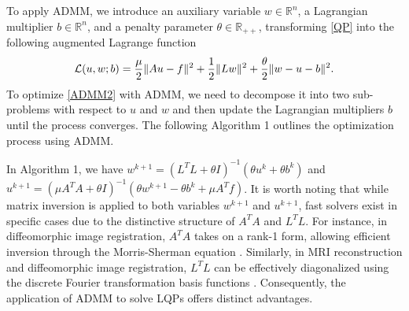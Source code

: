 \documentclass[letterpaper]{article} %
\begin{document}
To apply ADMM, we introduce an auxiliary variable $w \in \mathbb{R}^{n}$, a Lagrangian multiplier $b \in \mathbb{R}^{n}$, and a penalty parameter $\theta\in\mathbb{R}_{++}$, transforming \eqref{QP} into the following augmented Lagrange function
\begin{equation}\label{ADMM2}
{\cal L}({u,w; b}) = \frac{\mu}{2}\|Au-f\|^2+\frac{1}{2}\|L w\|^2+\frac{\theta}{2}\|w-u-b\|^2.
\end{equation}
To optimize \eqref{ADMM2} with ADMM, we need to decompose it into two sub-problems with respect to $u$ and $w$ and then update the Lagrangian multipliers $b$ until the process converges. The following Algorithm 1 outlines the optimization process using ADMM.
\begin{table}[t]
	\label{GADMM}
	\centering
\end{table}
In Algorithm 1, we have $w^{k+1}=( {L^T}L +\theta I)^{-1} (\theta u^k + \theta b^k)$ and $u^{k+1}=(\mu A^T A+\theta I)^{-1} (\theta w^{k+1} - \theta b^k + \mu A^T f)$. It is worth noting that while matrix inversion is applied to both variables $w^{k+1}$ and $u^{k+1}$, fast solvers exist in specific cases due to the distinctive structure of $A^TA$ and ${L^T}L$. For instance, in diffeomorphic image registration, $A^TA$ takes on a rank-1 form, allowing efficient inversion through the Morris-Sherman equation \cite{bartlett1951inverse,thorley2021nesterov}. Similarly, in MRI reconstruction and diffeomorphic image registration, $L^TL$ can be effectively diagonalized using the discrete Fourier transformation basis functions \cite{goldstein2009split,duan2023arbitrary}. Consequently, the application of ADMM to solve LQPs offers distinct advantages.
\end{document}
